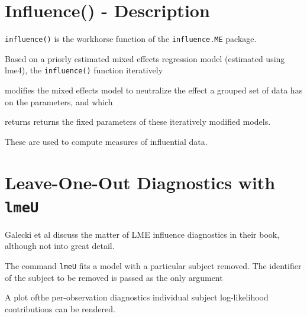 \documentclass[12pt, a4paper]{report}
\theoremstyle{plain}
\theoremstyle{definition}
\theoremstyle{remark}
\begin{document}
\section{Influence() - Description}
\texttt{influence()} is the workhorse function of the \texttt{influence.ME} package. 


Based on a priorly estimated mixed effects regression model (estimated using lme4), the \texttt{influence()} function iteratively 

modifies the mixed effects model to neutralize the effect a grouped set of data has on the parameters, and which 

returns returns the fixed parameters of these iteratively modified models. 

These are used to compute measures of influential data.




%	
%
%









\section{Leave-One-Out Diagnostics with \texttt{lmeU}}
Galecki et al discuss the matter of LME influence diagnostics in their book, although not into great detail.


The command \texttt{lmeU} fits a model with a particular subject removed. The identifier of the subject to be removed is passed as the only argument

A plot ofthe per-observation diagnostics individual subject log-likelihood contributions can be rendered.
\end{document}
